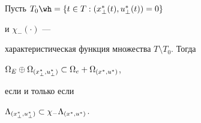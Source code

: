  


\begin{thm} 


Пусть $T_0\wh =\{t\in T:(x^*_\bot(t),u^*_\bot(t))=0\}$ 


и $\chi_-(\cdot)$ --- 


характеристическая функция множества $T\setminus T_0$. Тогда 


$\Omega_E\oplus\Omega_{\myxu{\bot}}\subset\Omega_e+ 


\Omega_{\myxu{}}$, 


если и только если 


$\Lambda_{{(x^*_{\bot},u^*_{\bot})}}\subset\chi_-\Lambda_{{(x^*_{},u^*_{})}}$. 


\end{thm} 


 


